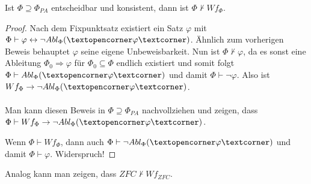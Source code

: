 \begin{satz}
	Ist $\Phi\supseteq\Phi_{PA}$ entscheidbar und konsistent, dann ist $\Phi\nvdash Wf_\Phi$.
\end{satz}
\begin{proof}
	Nach dem Fixpunktsatz existiert ein Satz $\varphi$ mit $\Phi\vdash\varphi\leftrightarrow\neg Abl_\Phi(\opencorner\varphi\closecorner)$. Ähnlich zum vorherigen Beweis \glqq behauptet \grqq{} $\varphi$ seine eigene Unbeweisbarkeit. Nun ist $\Phi\nvdash\varphi$, da es sonst eine Ableitung $\Phi_0\Rightarrow\varphi$ für $\Phi_0\subseteq\Phi$ endlich existiert und somit folgt $\Phi\vdash Abl_\Phi(\opencorner\varphi\closecorner)$ und damit $\Phi\vdash \neg\varphi$. Also ist $Wf_\Phi\rightarrow\neg Abl_\Phi(\opencorner\varphi\closecorner)$.
	\\
	\\
	Man kann diesen Beweis in $\Phi\supseteq\Phi_{PA}$ nachvollziehen und zeigen, dass $\Phi\vdash Wf_\Phi \rightarrow \neg Abl_\Phi(\opencorner\varphi\closecorner)$.
	
	Wenn $\Phi\vdash Wf_\Phi$, dann auch $\Phi\vdash \neg Abl_\Phi(\opencorner\varphi\closecorner)$ und damit $\Phi\vdash \varphi$. Widerspruch!
\end{proof}

Analog kann man zeigen, dass $ZFC\nvdash Wf_{ZFC}$.



